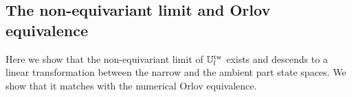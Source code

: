 \documentclass[11pt]{amsart}
\theoremstyle{definition} %
\theoremstyle{remark} %
\newcommand{\PP}{\mathbb P}
\newcommand{\UU}{\mathbb U}
\newcommand{\ZZ}{\mathbb Z}
\newcommand{\la}{\lambda}
\newcommand{\tw}{{\rm tw}}
\def\nn{N}
\def\GW{\operatorname{\text{GW}}}
\def\ol{\overline}
\def\wt{\widetilde}
\def\fracp#1{\left\langle #1 \right\rangle}
\newcommand{\frF}{\mathfrak{F}}
\newcommand{\unit}{\boldsymbol{1}}
\newcommand{\FJRW}{{\operatorname{FJRW}}}
\renewcommand{\GW}{{\operatorname{GW}}}
\newcommand{\grading}{\operatorname{\mathsf{Gr}}} %
\newcommand{\hGamma}{\widehat{\Gamma}}
\newcommand{\iu}{\mathtt{i}}
\newcommand{\Hf}{{\mathfrak{H}}}
\begin{document}
% 
% 
% 


\subsection{The non-equivariant limit and Orlov equivalence}
\label{subsec:noneqlimit-Orlov}
Here we show that the non-equivariant limit of $\UU^\tw_l$ 
exists and descends to a linear transformation between 
the narrow and the ambient part state spaces. 
We show that it matches with the numerical 
Orlov equivalence. 
\end{document}
